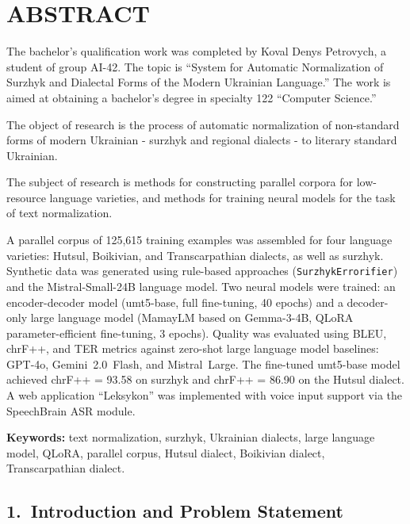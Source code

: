 \documentclass[14pt]{extarticle}
\let\oldaddcontentsline\addcontentsline
\renewcommand{\addcontentsline}[3]{\phantomsection\oldaddcontentsline{#1}{#2}{#3}}
\begin{document}
\clearpage

\section*{ABSTRACT}

The bachelor's qualification work was completed by Koval Denys Petrovych, a student of group AI-42.
The topic is ``System for Automatic Normalization of Surzhyk and Dialectal Forms of the Modern
Ukrainian Language.'' The work is aimed at obtaining a bachelor's degree in specialty
122 ``Computer Science.''

The object of research is the process of automatic normalization of non-standard forms of modern
Ukrainian - surzhyk and regional dialects - to literary standard Ukrainian.

The subject of research is methods for constructing parallel corpora for low-resource language
varieties, and methods for training neural models for the task of text normalization.

A parallel corpus of 125,615 training examples was assembled for four language varieties: Hutsul,
Boikivian, and Transcarpathian dialects, as well as surzhyk. Synthetic data was generated using
rule-based approaches (\texttt{SurzhykErrorifier}) and the Mistral-Small-24B language model. Two
neural models were trained: an encoder-decoder model (umt5-base, full fine-tuning, 40 epochs) and a
decoder-only large language model (MamayLM based on Gemma-3-4B, QLoRA parameter-efficient
fine-tuning, 3 epochs). Quality was evaluated using BLEU, chrF++, and TER metrics against zero-shot
large language model baselines: GPT-4o, Gemini~2.0~Flash, and Mistral~Large. The fine-tuned
umt5-base model achieved chrF++ = 93.58 on surzhyk and chrF++ = 86.90 on the Hutsul dialect. A web
application ``Leksykon'' was implemented with voice input support via the SpeechBrain ASR module.

\textbf{Keywords:} text normalization, surzhyk, Ukrainian dialects, large language model, QLoRA,
parallel corpus, Hutsul dialect, Boikivian dialect, Transcarpathian dialect.

\subsection*{1.~Introduction and Problem Statement}
\end{document}
